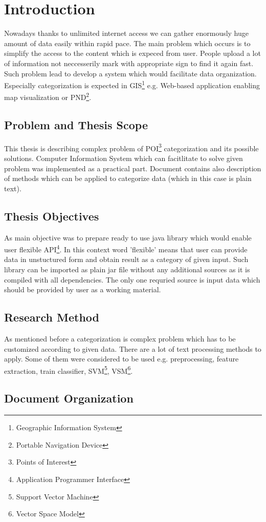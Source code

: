 \chapter{Introduction} \label{chap.introduction} 
{Nowadays thanks to unlimited internet access we can gather enormously huge amount of data easily within rapid pace. The main problem which occurs is to simplify the access to the content which is expeced from user. People upload a lot of information not neccesserily mark with appropriate sign to find it again fast. Such problem lead to develop a system which would facilitate data organization. Especially categorization is expected in GIS\footnote{Geographic Information System} e.g. Web-based application enabling map visualization or PND\footnote{Portable Navigation Device}.

}


\section{Problem and Thesis Scope}
This thesis is describing complex problem of POI\footnote{Points of Interest} categorization and its possible solutions. Computer Information System which can facitlitate to solve given problem was implemented as a practical part. Document contains also description of methods which can be applied to categorize data (which in this case is plain text). 

\section{Thesis Objectives}
As main objective was to prepare ready to use java library which would enable user flexible API\footnote{Application Programmer Interface}. In this context word 'flexible' means that user can provide data in unstuctured form and obtain result as a category of given input. Such library can be imported as plain jar file without any additional sources as it is compiled with all dependencies. The only one requried source is input data which should be provided by user as a working material. 

\section{Research Method}
As mentioned before a categorization is complex problem which has to be customized according to given data. There are a lot of text processing methods to apply. Some of them were considered to be used e.g. preprocessing, feature extraction, train classifier, SVM\footnote{Support Vector Machine}, VSM\footnote{Vector Space Model}.

\section{Document Organization}
